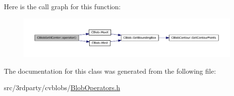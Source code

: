 Here is the call graph for this function:
\nopagebreak
\begin{figure}[H]
\begin{center}
\leavevmode
\includegraphics[width=400pt]{class_c_blob_get_x_center_aaaae40df5c1c031658100b16015896f0_cgraph}
\end{center}
\end{figure}




The documentation for this class was generated from the following file:\begin{DoxyCompactItemize}
\item 
src/3rdparty/cvblobs/\hyperlink{_blob_operators_8h}{BlobOperators.h}\end{DoxyCompactItemize}
